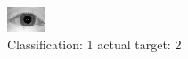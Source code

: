 \begin{figure}[h!]
\begin{center}
\includegraphics[width=0.60\columnwidth]{figures/ID943_class_1_target_2.png}
\end{center}
\caption{ Classification: 1 actual target: 2}
\label{fig:ID943_class_1_target_2}
\end{figure}

